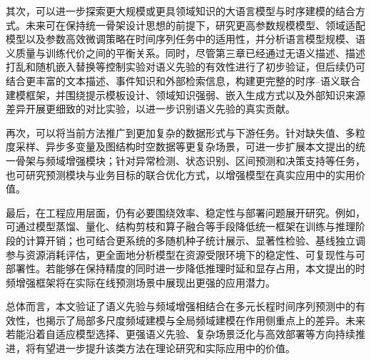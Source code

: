 其次，可以进一步探索更大规模或更具领域知识的大语言模型与时序建模的结合方式。未来可在保持统一骨架设计思想的前提下，研究更高参数规模模型、领域适配模型以及参数高效微调策略在时间序列任务中的适用性，并分析语言模型规模、语义质量与训练代价之间的平衡关系。同时，尽管第三章已经通过无语义描述、描述打乱和随机嵌入替换等控制实验对语义先验的有效性进行了初步验证，但后续仍可结合更丰富的文本描述、事件知识和外部检索信息，构建更完整的时序--语义联合建模框架，并围绕提示模板设计、领域知识强弱、嵌入生成方式以及外部知识来源差异开展更细致的对比实验，以进一步识别语义先验的真实贡献。

再次，可以将当前方法推广到更加复杂的数据形式与下游任务。针对缺失值、多粒度采样、异步多变量及图结构时空数据等更复杂场景，可进一步扩展本文提出的统一骨架与频域增强模块；针对异常检测、状态识别、区间预测和决策支持等任务，也可研究预测模块与业务目标的联合优化方式，以增强模型在真实应用中的实用价值。

最后，在工程应用层面，仍有必要围绕效率、稳定性与部署问题展开研究。例如，可通过模型蒸馏、量化、结构剪枝和算子融合等手段降低统一框架在训练与推理阶段的计算开销；也可结合更系统的多随机种子统计展示、显著性检验、基线独立调参与资源消耗评估，更全面地分析模型在资源受限环境下的稳定性、可复现性与可部署性。若能够在保持精度的同时进一步降低推理时延和显存占用，本文提出的时频增强框架将在实际在线预测场景中展现出更强的应用潜力。

总体而言，本文验证了语义先验与频域增强相结合在多元长程时间序列预测中的有效性，也揭示了局部多尺度频域建模与全局频域建模在作用侧重点上的差异。未来若能沿着自适应模型选择、更强语义先验、复杂场景泛化与高效部署等方向持续推进，将有望进一步提升该类方法在理论研究和实际应用中的价值。
